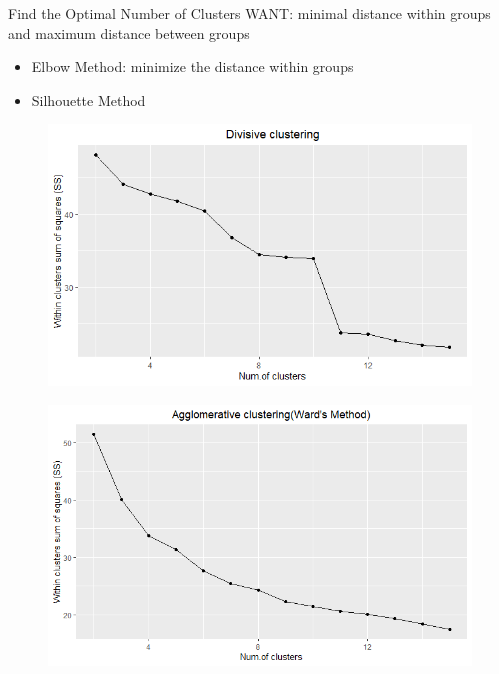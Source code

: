 \documentclass[11pt]{beamer}
\begin{document}
\begin{frame}{Find the Optimal Number of Clusters}
WANT: minimal distance within groups and maximum distance between groups
\begin{itemize}
    \item Elbow Method: minimize the distance within groups
    \item Silhouette Method
\end{itemize}
 \begin{figure}[!htb]
   \begin{minipage}{0.48\textwidth}
     \centering
     \includegraphics[width=1\linewidth]{images/elbow_for_dec.png}
     \label{Fig:skew1}
   \end{minipage}\hfill
   \begin{minipage}{0.48\textwidth}
     \centering
     \includegraphics[width=1\linewidth]{elbow_agg_ward.png}
     \label{Fig:skew2}
   \end{minipage}
\end{figure}

\end{frame}
\end{document}
